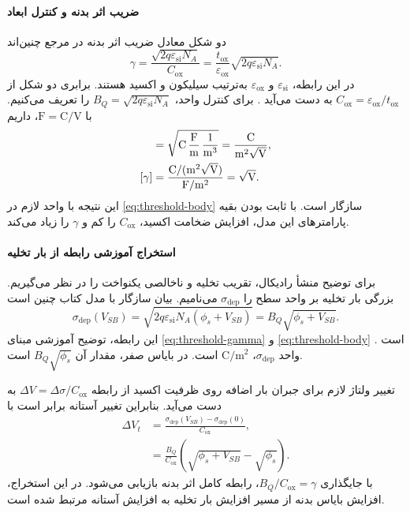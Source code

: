 \paragraph*{ضریب اثر بدنه و کنترل ابعاد}
دو شکل معادل ضریب اثر بدنه در مرجع چنین‌اند
\begin{equation}
 \gamma=\frac{\sqrt{2q\varepsilon_{\mathrm{si}}N_A}}{C_{\mathrm{ox}}}
 =\frac{t_{\mathrm{ox}}}{\varepsilon_{\mathrm{ox}}}
 \sqrt{2q\varepsilon_{\mathrm{si}}N_A}.
 \label{eq:threshold-gamma}
\end{equation}
در این رابطه، \(\varepsilon_{\mathrm{si}}\) و
\(\varepsilon_{\mathrm{ox}}\) به‌ترتیب  سیلیکون و اکسید
هستند. برابری دو شکل از
\(C_{\mathrm{ox}}=\varepsilon_{\mathrm{ox}}/t_{\mathrm{ox}}\) به دست
می‌آید \cite[رابطه ]{weste}.
برای کنترل واحد، \(B_Q=\sqrt{2q\varepsilon_{\mathrm{si}}N_A}\) را
تعریف می‌کنیم. با \(\mathrm{F}=\mathrm{C}/\mathrm{V}\)، داریم
\begin{align}
 [B_Q]&=\sqrt{\mathrm{C}\,
 \frac{\mathrm{F}}{\mathrm{m}}\,
 \frac{1}{\mathrm{m}^3}}
 =\frac{\mathrm{C}}{\mathrm{m}^2\sqrt{\mathrm{V}}},\notag\\
 [\gamma]&=\frac{\mathrm{C}/(\mathrm{m}^2\sqrt{\mathrm{V}})}
 {\mathrm{F}/\mathrm{m}^2}=\sqrt{\mathrm{V}}.
 \label{eq:threshold-gamma-units}
\end{align}
این نتیجه با واحد لازم در \eqref{eq:threshold-body} سازگار است.
با ثابت بودن بقیه پارامترهای این مدل، افزایش ضخامت اکسید،
\(C_{\mathrm{ox}}\) را کم و \(\gamma\) را زیاد می‌کند.

\paragraph*{استخراج آموزشی رابطه از بار تخلیه}
برای توضیح منشأ رادیکال، تقریب تخلیه و ناخالصی یکنواخت را در نظر می‌گیریم.
بزرگی بار تخلیه بر واحد سطح را \(\sigma_{\mathrm{dep}}\) می‌نامیم.
بیان سازگار با مدل کتاب چنین است
\begin{equation}
 \sigma_{\mathrm{dep}}(V_{SB})
 =\sqrt{2q\varepsilon_{\mathrm{si}}N_A(\phi_s+V_{SB})}
 =B_Q\sqrt{\phi_s+V_{SB}}.
 \label{eq:threshold-depletion-charge}
\end{equation}
این رابطه، توضیح آموزشی مبنای \eqref{eq:threshold-gamma} و
\eqref{eq:threshold-body} است
\cite[بخش ، روابط  تا ]{weste}.
واحد \(\sigma_{\mathrm{dep}}\)، \(\unit{\coulomb\per\metre\squared}\)
است. در بایاس صفر، مقدار آن \(B_Q\sqrt{\phi_s}\) است.

تغییر ولتاژ لازم برای جبران بار اضافه روی ظرفیت اکسید از رابطه
\(\Delta V=\Delta\sigma/C_{\mathrm{ox}}\) به دست می‌آید.
بنابراین تغییر آستانه برابر است با
\begin{align*}
 \Delta V_t&=\frac{\sigma_{\mathrm{dep}}(V_{SB})-
 \sigma_{\mathrm{dep}}(0)}{C_{\mathrm{ox}}},\\
 &=\frac{B_Q}{C_{\mathrm{ox}}}
 \left(\sqrt{\phi_s+V_{SB}}-\sqrt{\phi_s}\right).
\end{align*}
با جایگذاری \(B_Q/C_{\mathrm{ox}}=\gamma\)، رابطه کامل اثر بدنه بازیابی
می‌شود. در این استخراج، افزایش بایاس بدنه از مسیر افزایش بار تخلیه به
افزایش آستانه مرتبط شده است.

